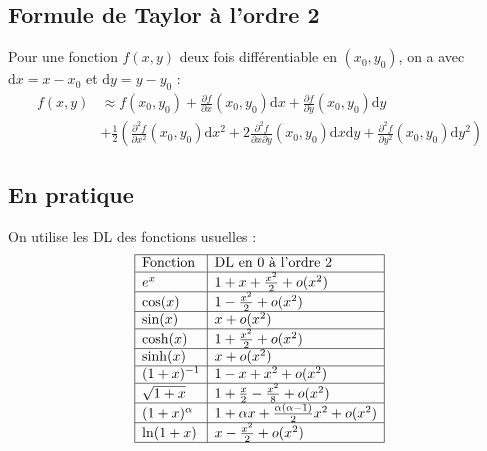 \documentclass[french]{yLectureNote}
\newcommand{\dd}{\mathrm{d}}
\begin{document}
\subsection{Formule de Taylor à l'ordre 2}
Pour une fonction $f(x,y)$ deux fois différentiable en $(x_0, y_0)$, on a avec $\dd x=x-x_0$ et $\dd y=y-y_0$ :
\begin{align*}
f(x,y) &\approx f(x_0,y_0) + \frac{\partial f}{\partial x}(x_0,y_0)\dd x + \frac{\partial f}{\partial y}(x_0,y_0)\dd y \\
&+ \frac{1}{2} \left( \frac{\partial^2 f}{\partial x^2}(x_0,y_0)\dd x^2 + 2\frac{\partial^2 f}{\partial x \partial y}(x_0,y_0)\dd x\dd y + \frac{\partial^2 f}{\partial y^2}(x_0,y_0)\dd y^2 \right)
\end{align*}
\subsection{En pratique}
On utilise les DL des fonctions usuelles :
\[
\begin{array}{|l|l|}
\hline
\text{Fonction} & \text{DL en 0 à l'ordre 2} \\
\hline
e^x & 1 + x + \frac{x^2}{2} + o(x^2) \\
\hline
\cos(x) & 1 - \frac{x^2}{2} + o(x^2) \\
\hline
\sin(x) & x + o(x^2) \\
\hline
\cosh(x) & 1 + \frac{x^2}{2} + o(x^2) \\
\hline
\sinh(x) & x + o(x^2) \\
\hline
(1+x)^{-1} & 1 - x + x^2 + o(x^2) \\
\hline
\sqrt{1+x} & 1 + \frac{x}{2} - \frac{x^2}{8} + o(x^2) \\
\hline
(1+x)^\alpha & 1 + \alpha x + \frac{\alpha(\alpha-1)}{2}x^2 + o(x^2) \\
\hline
\ln(1+x) & x - \frac{x^2}{2} + o(x^2) \\
\hline
\end{array}
\]
\end{document}
